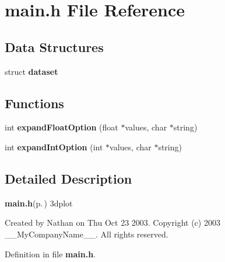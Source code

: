 \section{main.h File Reference}
\label{main_8h}
\subsection*{Data Structures}
\begin{CompactItemize}
\item 
struct {\bf dataset}
\end{CompactItemize}
\subsection*{Functions}
\begin{CompactItemize}
\item 
int {\bf expand\-Float\-Option} (float $\ast$values, char $\ast$string)\label{main_8h_a0}

\item 
int {\bf expand\-Int\-Option} (int $\ast$values, char $\ast$string)\label{main_8h_a1}

\end{CompactItemize}


\subsection{Detailed Description}
{\bf main.h}{\rm (p.\,\pageref{main_8h})} 3dplot

Created by Nathan on Thu Oct 23 2003. Copyright (c) 2003 \_\-\_\-My\-Company\-Name\_\-\_\-. All rights reserved.

Definition in file {\bf main.h}.